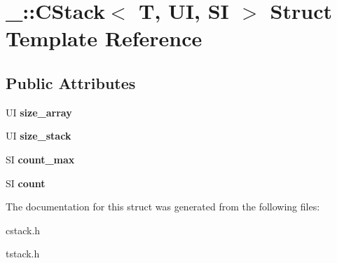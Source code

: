 \hypertarget{struct___1_1_c_stack}{}\section{\+\_\+\+:\+:C\+Stack$<$ T, UI, SI $>$ Struct Template Reference}
\label{struct___1_1_c_stack}
\subsection*{Public Attributes}
\begin{DoxyCompactItemize}
\item 
\mbox{\label{struct___1_1_c_stack_a2cb844909ae77cdd3ebf258e5596a449}} 
UI {\bfseries size\+\_\+array}
\item 
\mbox{\label{struct___1_1_c_stack_ad804024f8b065d7a0da602ae1489ff94}} 
UI {\bfseries size\+\_\+stack}
\item 
\mbox{\label{struct___1_1_c_stack_a8c39cd7bd00e3e82734983906120a0a6}} 
SI {\bfseries count\+\_\+max}
\item 
\mbox{\label{struct___1_1_c_stack_ad709d196c244f5abad0b0ce2da7b9d3f}} 
SI {\bfseries count}
\end{DoxyCompactItemize}


The documentation for this struct was generated from the following files\+:\begin{DoxyCompactItemize}
\item 
cstack.\+h\item 
tstack.\+h\end{DoxyCompactItemize}
